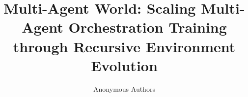 \documentclass{article}
\title{Multi-Agent World: Scaling Multi-Agent Orchestration Training through Recursive Environment Evolution}
\author{Anonymous Authors}
\begin{document}
\raggedbottom

\maketitle

\begin{abstract}

\end{abstract}










\FloatBarrier



\clearpage
\appendix

\end{document}
